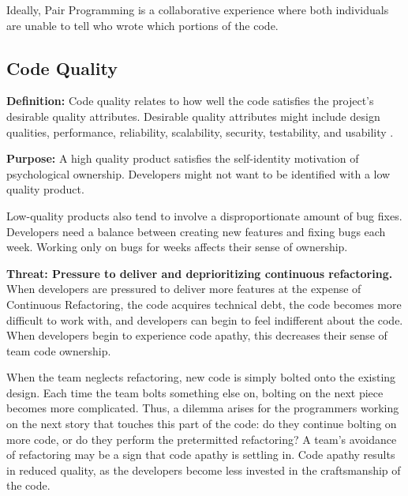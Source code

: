 



Ideally, Pair Programming is a collaborative experience where both individuals are unable to tell who wrote which portions of the code. 


\subsection{Code Quality}
\textbf{Definition:} Code quality relates to how well the code satisfies the project's desirable quality attributes. Desirable quality attributes might include design qualities, performance, reliability, scalability, security,  testability, and usability \cite{Meier2009}. 


\textbf{Purpose:} A high quality product satisfies the self-identity motivation of psychological ownership. Developers might not want to be identified with a low quality product.


Low-quality products also tend to involve a disproportionate amount of bug fixes. Developers need a balance between creating new features and fixing bugs each week. Working only on bugs for weeks affects their sense of ownership.    


\textbf{Threat: Pressure to deliver and deprioritizing continuous refactoring.} When developers are pressured to deliver more features at the expense of Continuous Refactoring, the code acquires technical debt, the code becomes more difficult to work with, and developers can begin to feel indifferent about the code. When developers begin to experience code apathy, this decreases their sense of team code ownership. 


When the team neglects refactoring, new code is simply bolted onto the existing design. Each time the team bolts something else on, bolting on the next piece becomes more complicated. Thus, a dilemma arises for the programmers working on the next story that touches this part of the code: do they continue bolting on more code, or do they perform the pretermitted refactoring? A team's avoidance of refactoring may be a sign that code apathy is settling in. Code apathy results in reduced quality, as the developers become less invested in the craftsmanship of the code.



